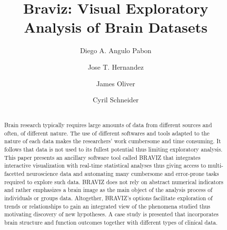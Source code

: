 \documentclass[twocolumn]{svjour3} %
\begin{document}
\title{Braviz: Visual Exploratory Analysis of Brain Datasets} 

\author{Diego A. Angulo Pabon \and Jose T. Hernandez \and James Oliver \and Cyril Schneider}



\maketitle


\begin{abstract}

\section{}
Brain research typically requires large amounts of data from different sources and often, of different nature. The use of different softwares and tools adapted to the nature of each data makes the researchers’ work cumbersome and time consuming. It follows that data is not used to its fullest potential thus limiting exploratory analysis. This paper presents an ancillary software tool called BRAVIZ that integrates interactive visualization with real-time statistical analyses thus giving access to multi-facetted neuroscience data and automating many cumbersome and error-prone tasks required to explore such data. BRAVIZ does not rely on abstract numerical indicators and rather emphasizes a brain image as the main object of the analysis process of individuals or groups data. Altogether, BRAVIZ’s options facilitate exploration of trends or relationships to gain an integrated view of the phenomena studied thus motivating discovery of new hypotheses. A case study is presented that incorporates brain structure and function outcomes together with different types of clinical data.

\end{abstract}
\end{document}
